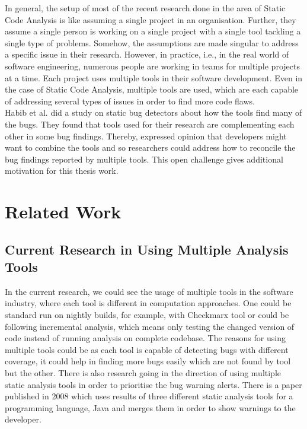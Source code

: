 In general, the setup of most of the recent research \cite{CB16} \cite{JSMB13} done in the area of Static Code Analysis is like assuming a single project in an organisation. Further, they assume a single person is working on a single project with a single tool tackling a single type of problems. Somehow, the assumptions are made singular to address a specific issue in their research. However, in practice, i.e., in the real world of software engineering, numerous people are working in teams for multiple projects at a time. Each project uses multiple tools in their software development. Even in the case of Static Code Analysis, multiple tools are used, which are each capable of addressing several types of issues in order to find more code flaws. \cite{SCALe} \\

Habib et al. \cite{habib} did a study on static bug detectors about how the tools find many of the bugs. They found that tools used for their research are complementing each other in some bug findings.  Thereby, expressed opinion that developers might want to combine the tools and so researchers could address how to reconcile the bug findings reported by multiple tools. This open challenge gives additional motivation for this thesis work.

\section{Related Work}
\label{ch:relatedwork_report}

\subsection{Current Research in Using Multiple Analysis Tools}

In the current research, we could see the usage of multiple tools in the software industry, where each tool is different in computation approaches. One could be standard run on nightly builds, for example, with Checkmarx \cite{checkmarx} tool or could be following incremental analysis, which means only testing the changed version of code instead of running analysis on complete codebase. The reasons for using multiple tools could be as each tool is capable of detecting bugs with different coverage, \cite{bessey2010few} \cite{delaitre2015evaluating} it could help in finding more bugs easily which are not found by tool but the other. \cite{plakosh2014improving} There is also research \cite{flynn2018prioritizing} going in the direction of using multiple static analysis tools in order to prioritise the bug warning alerts. There is a paper \cite{meng2008approach} published in 2008 which uses results of three different static analysis tools for a programming language, Java and merges them in order to show warnings to the developer. \\ \\

